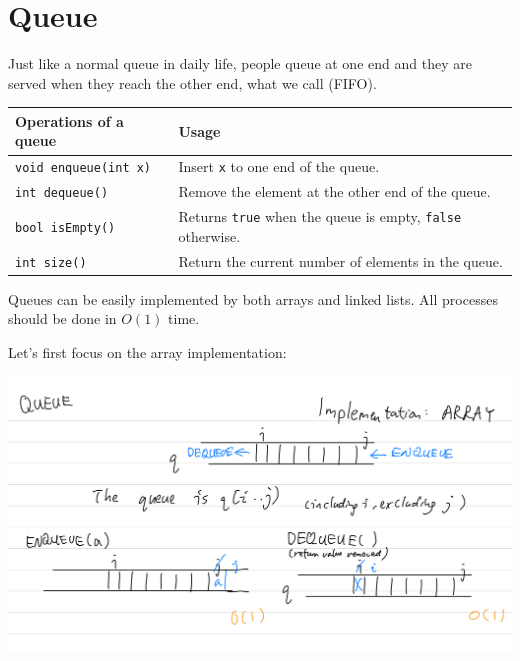 \section{Queue}
Just like a normal queue in daily life, people queue at one end and they are served when they reach the other end, what we call  (FIFO).

\begin{table}[h]
    \centering
    \begin{tabular}{|m{11em}|m{24em}|}
        \hline
        \textbf{Operations of a queue} & 
        Usage
        \\ \hline \hline
        
        \texttt{void enqueue(int x)} &
        Insert \texttt{x} to one end of the queue.
        \\ \hline
        
        \texttt{int dequeue()} &
        Remove the element at the other end of the queue.
        \\ \hline
        
        \texttt{bool isEmpty()} &
        Returns \texttt{true} when the queue is empty, \texttt{false} otherwise.
        \\ \hline
        
        \texttt{int size()} &
        Return the current number of elements in the queue.
        \\ \hline
    \end{tabular}
\end{table}

Queues can be easily implemented by both arrays and linked lists. All processes should be done in $O(1)$ time.

Let's first focus on the array implementation:

\includegraphics[width=14cm]{images/ch6-qarray.png}

